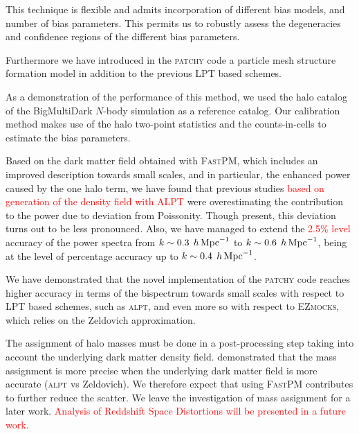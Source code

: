\documentclass[english,usenatbib]{mn2e}
\newcommand{\tod}[1]{{\textcolor{red}{ #1}}}
\newcommand{\hperm}{\,h\,{\rm Mpc}^{-1}}
\begin{document}
This technique is flexible and admits incorporation of different bias models, and number of bias parameters. This permits us to robustly assess the degeneracies and confidence regions of the different bias parameters.

Furthermore we have introduced in the \textsc{patchy} code a particle mesh structure formation model \citep[the \textsc{FastPM} code, see][]{fastpm} in addition to the previous LPT based schemes.


As a demonstration of the performance of this method, we used the halo catalog of the BigMultiDark $N$-body simulation as a reference catalog. Our calibration method makes use of the halo two-point statistics and the counts-in-cells to estimate the bias parameters. 

Based on the dark matter field obtained with \textsc{FastPM}, which includes an improved description towards small scales, and in particular, the enhanced power caused by the one halo term, we have found that previous studies \tod{based on generation of the density field with \textsc{ALPT}} were overestimating the contribution to the power due to deviation from Poissonity. Though present, this deviation turns out to be less pronounced. Also, we have managed to extend the \tod{2.5\% level} accuracy of the power spectra from $k\sim 0.3\; \hperm$ to $k\sim 0.6 \;\hperm$, being at the level of percentage accuracy up to $k\sim 0.4\; \hperm$.

We have demonstrated that the novel implementation of the \textsc{patchy} code reaches higher accuracy in terms of the bispectrum towards small scales with respect to LPT based schemes, such as \textsc{alpt}, and even more so with respect to \textsc{EZmocks}, which relies on the Zeldovich approximation. 

The assignment of halo masses must be done in a post-processing step taking into account the underlying dark matter density field. \citet{zhao2015} demonstrated that the mass assignment is more precise when the underlying dark matter field is more accurate (\textsc{alpt} vs Zeldovich). We therefore expect that using \textsc{FastPM} contributes to further reduce the scatter. We leave the investigation of mass assignment for a later work. \tod{Analysis of Reddshift Space Distortions will be presented in a future work.}

\end{document}
